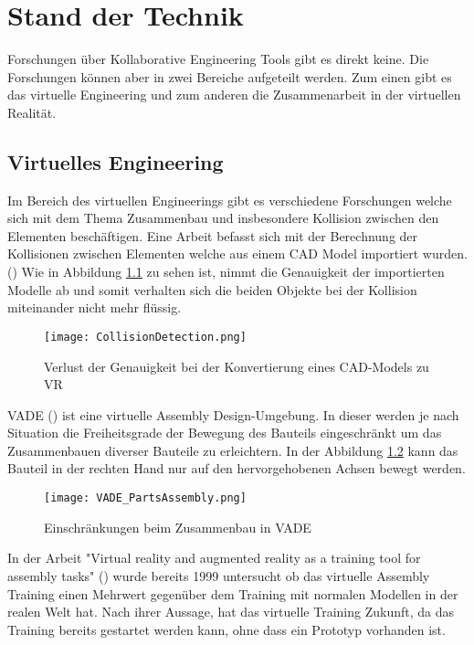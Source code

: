 \chapter{Stand der Technik}
\label{ch:StandDerTechnik}

Forschungen über Kollaborative Engineering Tools gibt es direkt keine. Die Forschungen können aber in zwei Bereiche aufgeteilt werden. Zum einen gibt es das virtuelle Engineering und zum anderen die Zusammenarbeit in der virtuellen Realität.

\section{Virtuelles Engineering}

Im Bereich des virtuellen Engineerings gibt es verschiedene Forschungen welche sich mit dem Thema Zusammenbau und insbesondere Kollision zwischen den Elementen beschäftigen.
Eine Arbeit befasst sich mit der Berechnung der Kollisionen zwischen Elementen welche aus einem CAD Model importiert wurden. (\cite{tching_interactive_2010})
Wie in Abbildung \ref{fig:LossOfAccuracy} zu sehen ist, nimmt die Genauigkeit der importierten Modelle ab und somit verhalten sich die beiden Objekte bei der Kollision miteinander nicht mehr flüssig.

\begin{figure}[h!]
	\centering
	\texttt{[image: CollisionDetection.png]}
	\caption{Verlust der Genauigkeit bei der Konvertierung eines CAD-Models zu VR}
	\label{fig:LossOfAccuracy}
\end{figure}

\noindent VADE (\cite{noauthor_vade:_nodate}) ist eine virtuelle Assembly Design-Umgebung. In dieser werden je nach Situation die Freiheitsgrade der Bewegung des Bauteils eingeschränkt um das Zusammenbauen diverser Bauteile zu erleichtern. 
In der Abbildung \ref{fig:VADEAssembly} kann das Bauteil in der rechten Hand nur auf den hervorgehobenen Achsen bewegt werden. \\

\begin{figure}[h!]
	\centering
	\texttt{[image: VADE\_PartsAssembly.png]}
	\caption{Einschränkungen beim Zusammenbau in VADE}
	\label{fig:VADEAssembly}
\end{figure}

\noindent In der Arbeit "Virtual reality and augmented reality as a training tool for assembly tasks" (\cite{boud_virtual_1999}) wurde bereits 1999 untersucht ob das virtuelle Assembly Training einen Mehrwert gegenüber dem Training mit normalen Modellen in der realen Welt hat. Nach ihrer Aussage, hat das virtuelle Training Zukunft, da das Training bereits gestartet werden kann, ohne dass ein Prototyp vorhanden ist.

